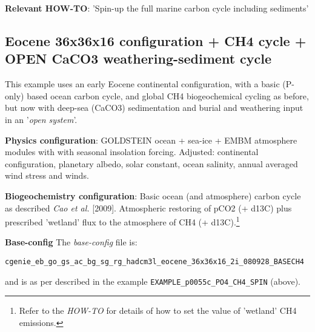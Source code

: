 \documentclass[10pt,twoside]{article}
\begin{document}
\noindent \textbf{Relevant HOW-TO}: 'Spin-up the full marine carbon cycle including sediments'



\subsection{Eocene 36x36x16 configuration + CH4 cycle + OPEN CaCO3 weathering-sediment cycle}\label{EXAMPLE_p0055c_PO4_CH4_S72x72_SPIN2}

This example uses an early Eocene continental configuration, with a basic (P-only) based ocean carbon cycle, and global CH4 biogeochemical cycling as before, but now with deep-sea (CaCO3) sedimentation and burial and weathering input in an '\textit{open system}'.

\noindent \textbf{Physics configuration}: GOLDSTEIN ocean + sea-ice + EMBM atmosphere modules with with seasonal insolation forcing. Adjusted: continental configuration, planetary albedo, solar constant, ocean salinity, annual averaged wind stress and winds.

\noindent \textbf{Biogeochemistry configuration}: Basic ocean (and atmosphere) carbon cycle as described \textit{Cao et al.} [2009]. Atmospheric restoring of pCO2 (+ d13C) plus prescribed 'wetland' flux to the atmosphere of CH4 (+ d13C).\footnote{Refer to the \textit{HOW-TO} for details of how to set the value of 'wetland' CH4 emissions.}

\noindent \textbf{Base-config} The \textit{base-config} file is:
\vspace{-10pt}\begin{verbatim}cgenie_eb_go_gs_ac_bg_sg_rg_hadcm3l_eocene_36x36x16_2i_080928_BASECH4 \end{verbatim}\vspace{-10pt}
and is as per described in the example \texttt{EXAMPLE\_p0055c\_PO4\_CH4\_SPIN} (above).
\end{document}
